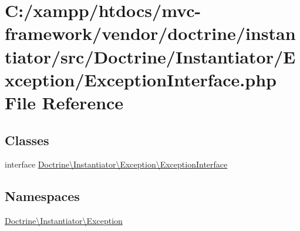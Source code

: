 \hypertarget{doctrine_2instantiator_2src_2_doctrine_2_instantiator_2_exception_2_exception_interface_8php}{}\section{C\+:/xampp/htdocs/mvc-\/framework/vendor/doctrine/instantiator/src/\+Doctrine/\+Instantiator/\+Exception/\+Exception\+Interface.php File Reference}
\label{doctrine_2instantiator_2src_2_doctrine_2_instantiator_2_exception_2_exception_interface_8php}
\subsection*{Classes}
\begin{DoxyCompactItemize}
\item 
interface \hyperlink{interface_doctrine_1_1_instantiator_1_1_exception_1_1_exception_interface}{Doctrine\textbackslash{}\+Instantiator\textbackslash{}\+Exception\textbackslash{}\+Exception\+Interface}
\end{DoxyCompactItemize}
\subsection*{Namespaces}
\begin{DoxyCompactItemize}
\item 
 \hyperlink{namespace_doctrine_1_1_instantiator_1_1_exception}{Doctrine\textbackslash{}\+Instantiator\textbackslash{}\+Exception}
\end{DoxyCompactItemize}
